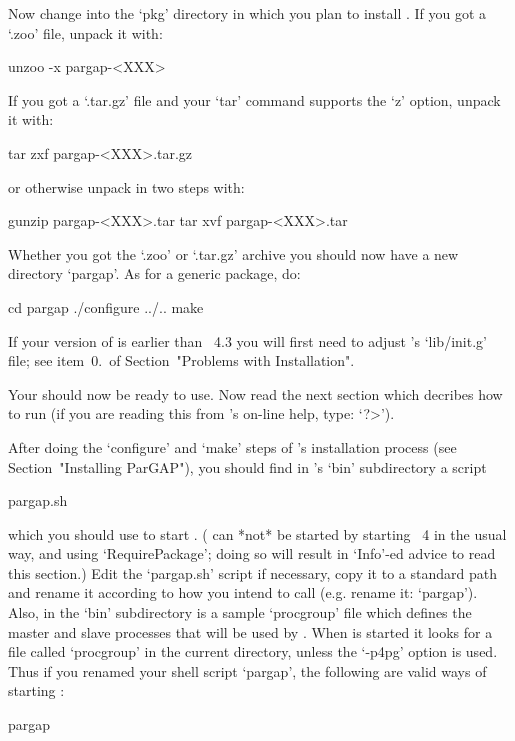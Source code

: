 Now change into  the  `pkg'  directory  in  which  you  plan  to  install
{\ParGAP}. If you got a `.zoo' file, unpack it with:

unzoo -x pargap-<XXX>

If you got a `.tar.gz' file and  your  `tar'  command  supports  the  `z'
option, unpack it with:

tar zxf pargap-<XXX>.tar.gz

or otherwise unpack in two steps with:

gunzip pargap-<XXX>.tar
tar xvf pargap-<XXX>.tar

Whether you got the `.zoo' or `.tar.gz' archive you should now have a new
directory `pargap'. As for a generic {\GAP} package, do:

\begintt
cd pargap
./configure ../..
make
\endtt

If your version of {\GAP} is earlier than {\GAP}~4.3 you will first  need
to adjust {\GAP}'s `lib/init.g' file; see item~0.\  of  Section~"Problems
with Installation".

Your {\ParGAP} should now be ready to use.  Now  read  the  next  section
which decribes how to  run  {\ParGAP}  (if  you  are  reading  this  from
{\GAP}'s on-line help, type: `?>').


After doing the `configure' and `make' steps of {\ParGAP}'s  installation
process (see Section~"Installing ParGAP"), you should find in {\ParGAP}'s
`bin' subdirectory a script

\begintt
pargap.sh
\endtt

which you should use to start {\ParGAP}. ({\ParGAP} can *not* be  started
by starting {\GAP}~4 in the usual way, and using `RequirePackage';  doing
so will result in `Info'-ed  advice  to  read  this  section.)  Edit  the
`pargap.sh' script if necessary, copy it to a standard path and rename it
according to how you intend to call {\ParGAP} (e.g. rename it: `pargap').
Also, in the `bin'  subdirectory  is  a  sample  `procgroup'  file  which
defines the master and slave processes that will be  used  by  {\ParGAP}.
When {\ParGAP} is started it looks for a file called `procgroup'  in  the
current directory, unless the `-p4pg' option is used. Thus if you renamed
your shell script `pargap', the following  are  valid  ways  of  starting
{\ParGAP}:

\begintt
pargap
\endtt

